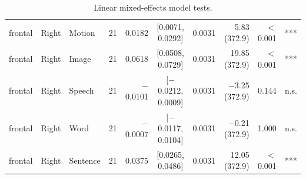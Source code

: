 \begin{table}[h]
\begin{tabular}{lllrrcrrrl}
frontal & Right & Motion & 21 & 0.0182 & [0.0071, 0.0292] & 0.0031 & 5.83 (372.9) & $<$0.001 & *** \\
frontal & Right & Image & 21 & 0.0618 & [0.0508, 0.0729] & 0.0031 & 19.85 (372.9) & $<$0.001 & *** \\
frontal & Right & Speech & 21 & $-$0.0101 & [$-$0.0212, 0.0009] & 0.0031 & $-$3.25 (372.9) & 0.144 & n.s. \\
frontal & Right & Word & 21 & $-$0.0007 & [$-$0.0117, 0.0104] & 0.0031 & $-$0.21 (372.9) & 1.000 & n.s. \\
frontal & Right & Sentence & 21 & 0.0375 & [0.0265, 0.0486] & 0.0031 & 12.05 (372.9) & $<$0.001 & *** \\
\bottomrule
\end{tabular}
\caption{Linear mixed-effects model tests.}
\end{table}
